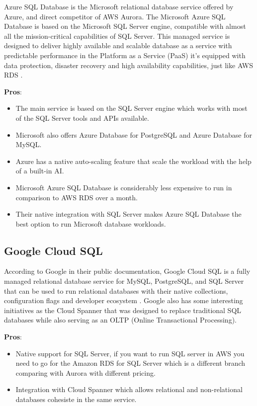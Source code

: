 \documentclass{article}
\begin{document}
Azure SQL Database is the Microsoft relational database service offered by Azure, and direct competitor of AWS Aurora. The Microsoft Azure SQL Database is based on the Microsoft SQL Server engine, compatible with almost all the mission-critical capabilities of SQL Server. This managed service is designed to deliver highly available and scalable database as a service with predictable performance in the Platform as a Service (PaaS) it's equipped with data protection, disaster recovery and high availability capabilities, just like AWS RDS \cite{mazumdar2016azure}.

\textbf{Pros}:
\begin{itemize}
    \item The main service is based on the SQL Server engine which works with most of the SQL Server tools and APIs available.
    \item Microsoft also offers Azure Database for PostgreSQL and Azure Database for MySQL.
    \item Azure has a native auto-scaling feature that scale the workload with the help of a built-in AI.
    \item Microsoft Azure SQL Database is considerably less expensive to run in comparison to AWS RDS over a month.
    \item Their native integration with SQL Server makes Azure SQL Database the best option to run Microsoft database workloads. 
    \cite{rdsvsazure2019}
\end{itemize}
\subsection{Google Cloud SQL}

According to Google in their public documentation, Google Cloud SQL is a fully managed relational database service for MySQL, PostgreSQL, and SQL Server that can be used to run relational databases with their native collections, configuration flags and developer ecosystem \cite{GoogleSql}. Google also has some interesting initiatives as the Cloud Spanner that was designed to replace traditional SQL databases while also serving as an OLTP (Online Transactional Processing).

\textbf{Pros}:
\begin{itemize}
    \item Native support for SQL Server, if you want to run SQL server in AWS you need to go for the Amazon RDS for SQL Server which is a different branch comparing with Aurora with different pricing. 
    \item Integration with Cloud Spanner which allows relational and non-relational databases cohesiste in the same service.
\end{itemize}
\end{document}
